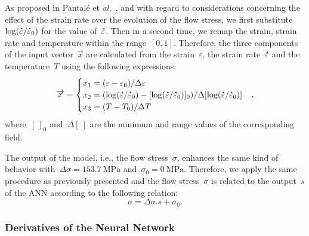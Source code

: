\documentclass[algorithms,article,submit,pdftex,oneauthors]{Definitions/mdpi}
\makeatletter
\DeclareRobustCommand{\mdot}[1]{\accentset{\mbox{\bfseries .}}{#1}}
\DeclareRobustCommand{\ie}{i.e.,\@\xspace}
\DeclareRobustCommand{\eal}{et \emph{al.}\@\xspace}
\DeclareRobustCommand{\MPa}{\text{MPa}}
\makeatother
\begin{document}
As proposed in Pantalé \eal~\cite{Pantale-2021-EIN}, and with regard to considerations concerning the effect of the strain rate over the evolution of the flow stress, we first substitute~$\log(\mdot{\varepsilon}/\mdot{\varepsilon}_{0})$ for the value of~$\mdot{\varepsilon}$.
Then in a second time, we remap the strain, strain rate and temperature within the range~$[0,1]$.
Therefore, the three components of the input vector~$\overrightarrow{x}$ are calculated from the strain~$\varepsilon$, the strain rate~$\mdot{\varepsilon}$ and the temperature~$T$ using the following expressions:
\begin{equation}
\overrightarrow{x}=
\begin{cases}
x_{1} = \left(\varepsilon - \varepsilon_{0}\right)/\Delta\varepsilon \\
x_{2} = \left(\log(\mdot{\varepsilon}/\mdot{\varepsilon}_{0})-[\log(\mdot{\varepsilon}/\mdot{\varepsilon}_{0})]_{0}\right)/\Delta[\log(\mdot{\varepsilon}/\mdot{\varepsilon}_{0})]\\
x_{3} = \left(T-T_{0}\right)/\Delta T
\end{cases},
\label{eq:ANN-input}
\end{equation}
where~$[~]_{0}$ and~$\Delta[~]$ are the minimum and range values of the corresponding field.

The output of the model, \ie the flow stress~$\sigma$, enhances the same kind of behavior with~$\Delta\sigma=153.7~\MPa$ and~$\sigma_{0}=0~\MPa$.
Therefore, we apply the same procedure as previously presented and the flow stress~$\sigma$ is related to the output~$s$ of the ANN according to the following relation:
\begin{equation}
\sigma = \Delta\sigma.s + \sigma_{0}.\label{eq:ANN-output}
\end{equation}

\subsubsection{Derivatives of the Neural Network}\label{subsubsec:ANN-der}
\end{document}
